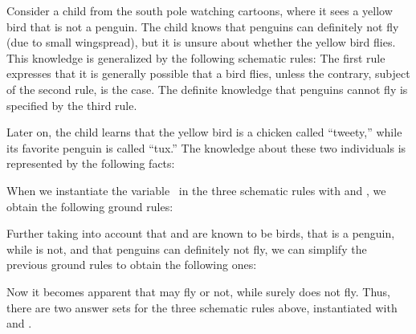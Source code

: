 \begin{example}\label{ex:flies}
Consider a child from the south pole watching cartoons,
where it sees a yellow bird that is not a penguin.
The child knows that penguins can definitely not fly (due to small wingspread),
but it is unsure about whether the yellow bird flies.
This knowledge is generalized by
the following schematic rules:
%
%
The first rule expresses that it is generally possible that a bird flies,
unless the contrary, subject of the second rule, is the case.
The definite knowledge that penguins cannot fly
is specified by the third rule.

Later on, the child learns that the yellow bird
is a chicken called ``tweety,''
while its favorite penguin is called ``tux.''
The knowledge about these two individuals is
represented by the following facts:


When we instantiate the variable~ in the three schematic rules
with  and ,
we obtain the following ground rules:
%

%
Further taking into account that  and  are known to
be birds, that  is a penguin, while  is not, and that
penguins can definitely not fly,
we can simplify the previous ground rules to obtain the following ones:%
%

%
Now it becomes apparent that 
may fly or not, while  surely does not fly.
Thus, there are two answer sets for the three schematic rules above,
instantiated with  and .%
\eexample
\end{example}

